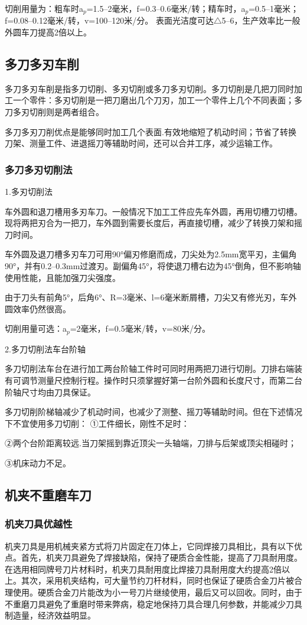 \documentclass{ctexbook}
\begin{document}
切削用量为：粗车时a$_p$=1.5--2毫米，f=0.3--0.6毫米/转；精车时，a$_p$=0.5--1毫米；f=0.08--0.12毫米/转，v=100--120米/分。
表面光洁度可达$\bigtriangleup$5--6，生产效率比一般外圆车刀提高2倍以上。
\subsection{多刀多刃车削}
多刀多刃车削是指多刀切削、多刃切削或多刀多刃切削。多刀切削是几把刀同时加工一个零件：多刃切削是一把刀磨出几个刀刃，加工一个零件上几个不同表面；多刀多刃切削则是两者组合。

多刀多刃刀削优点是能够同时加工几个表面.有效地缩短了机动时间；节省了转换刀架、测量工件、进退摇刀等辅助时间，还可以合并工序，减少运输工作。
\subsubsection{多刀多刃切削法}	
1.多刃切削法

车外圆和退刀槽用多刃车刀。一般情况下加工工件应先车外圆，再用切槽刀切槽。现将两把刃合为一把刀，车外圆到需要长度后，再直接切槽，减少了转换刀架和摇刀时间。

车外圆及退刀槽多刃车刀可用90°偏刃修磨而成，刀尖处为2.5mm宽平刃，主偏角90°，并有0.2--0.3mm过渡刃。副偏角45°，将使退刀槽右边为45°倒角，但不影响轴使用性能，且能加强刀尖强度。

由于刀头有前角5°，后角6°、R=3毫米、l=6毫米断屑槽，刀尖又有修光刃，车外圆效率仍然很高。

切削用量可选：a$_p$=2毫米，f=0.5毫米/转，v=80米/分。

2.多刀切削法车台阶轴

多刀切削法车台在进行加工两台阶轴工件时可同时用两把刀进行切削。刀排右端装有可调节测量尺控制行程。操作时只须掌握好第一台阶外圆和长度尺寸，而第二台阶轴尺寸均由刀具保证。

多刀切削阶梯轴减少了机动时间，也减少了测整、摇刀等辅助时间。但在下述情况下不宜使用多刀切削：
①工件细长，刚性不足时：

②两个台阶距离较远.当刀架摇到靠近顶尖一头轴端，刀排与后架或顶尖相碰时；

③机床动力不足。
\subsection{机夹不重磨车刀}
\subsubsection{机夹刀具优越性}
机夹刀具是用机械夹紧方式将刀片固定在刀体上，它同焊接刀具相比，具有以下优点。首先，机夹刀具避免了焊接缺陷，保持了硬质合金性能，提高了刀具耐用度。在选用相同牌号刀片材料时，机夹刀具耐用度比焊接刀具耐用度大约提高2倍以上。其次，采用机夹结构，可大量节约刀杆材料，同时也保证了硬质合金刀片被合理使用。硬质合金刀片能改为小一号刀片继绫使用，最后又可以回收。同时，由于不重磨刀具避免了重磨时带来弊病，稳定地保持刀具合理几何参数，并能减少刀具制造量，经济效益明显。
\end{document}
